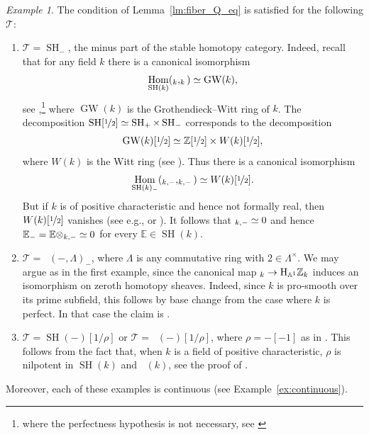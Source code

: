 \documentclass[11pt]{article}
\makeatletter
\newcommand{\eg}{e.g.,\xspace}
\numberwithin{equation}{section}\renewcommand{\encodingdefault}{TU}
\DeclareRobustCommand{\mathbbm}[1]{\csname jepbb@#1\endcsname}
\newcommand{\T}{\mathscr T}
\DeclareMathOperator{\GW}{GW}
\renewcommand{\AA}{\mathbb A}
\newcommand{\E}{\mathbb E}
\newcommand{\un}{\mathbbm 1}
\newcommand{\HA}{\mathrm H_{\AA^1}}
\DeclareMathOperator{\SH}{SH}
\DeclareMathOperator{\DA}{D_{\AA^1}}
\DeclareMathOperator{\Hom}{Hom}
\newcommand{\ZZ} {\mathbb Z}
\newcommand{\ZZot} {\mathbb Z[\nicefrac 1 2]}
\newcommand{\ot} {{\nicefrac 1 2}}
\theoremstyle{remark}
\newtheorem{ex}[thm]{Example}
\theoremstyle{definition}
\numberwithin{equation}{thm}
\makeatother
\begin{document}
\begin{ex}\label{ex:keylemma}
The condition of Lemma~\ref{lm:fiber_Q_eq} is satisfied for the following $\T$:
\begin{enumerate}
\item\label{item:keylemma/SHminus}
$\T=\SH_-$, the minus part of the stable homotopy category.
Indeed, recall that for any field $k$ there is a canonical isomorphism
\[\Hom_{\SH(k)}(\un_k,\un_k) \simeq \GW(k),\]
see \cite[Cor.\,1.25]{MorelA1},\footnote{where the perfectness hypothesis is not necessary, see \cite[Th.\,10.12]{BachmannHoyois}} where $\GW(k)$ is the Grothendieck--Witt ring of $k$.
The decom\-po\-sition $\SH[\ot] \simeq \SH_+ \times \SH_-$ corresponds to the decomposition
\[ \GW(k)[\ot] \simeq \ZZot \times W(k)[\ot], \]
where $W(k)$ is the Witt ring (see \cite[Eq.\,(3.1)]{MorelA1}).
Thus there is a canonical isomorphism
\[ \Hom_{\SH(k)_-}(\un_{k,-},\un_{k,-}) \simeq W(k)[\ot]. \]
But if $k$ is of positive characteristic and hence not formally real, then $W(k)[\ot]$ vanishes (see \eg \cite[\S31.A]{EKM} or \cite[Chap.\,VIII, Lem.\,3.4]{LamQuadratic}).
It follows that $\un_{k,-} \simeq 0$ and hence $\E_- = \E \otimes \un_{k,-} \simeq 0$ for every $\E \in \SH(k)$.

\item\label{item:keylemma/DAminus}
$\T=\DA(-, \Lambda)_-$, where $\Lambda$ is any commutative ring with $2 \in \Lambda^\times$.
We may argue as in the first example, since the canonical map $\un_k \to \HA \ZZ_k$ induces an isomorphism on zeroth homotopy sheaves.
Indeed, since $k$ is pro-smooth over its prime subfield, this follows by base change from the case where $k$ is perfect.
In that case the claim is \cite[Th.\,6.37]{MorelA1}.

\item\label{item:keylemma/SHrhoinv}
$\T=\SH(-)[1/\rho]$ or $\T=\DA(-)[1/\rho]$, where $\rho=-[-1]$ as in \cite[Cor.\,19]{Bachmann}.
This follows from the fact that, when $k$ is a field of positive characteristic, $\rho$ is nilpotent in $\SH(k)$ and $\DA(k)$, see the proof of \cite[Cor.\,32]{Bachmann}.
\end{enumerate}
Moreover, each of these examples is continuous (see Example~\ref{ex:continuous}).
\end{ex}
\end{document}
